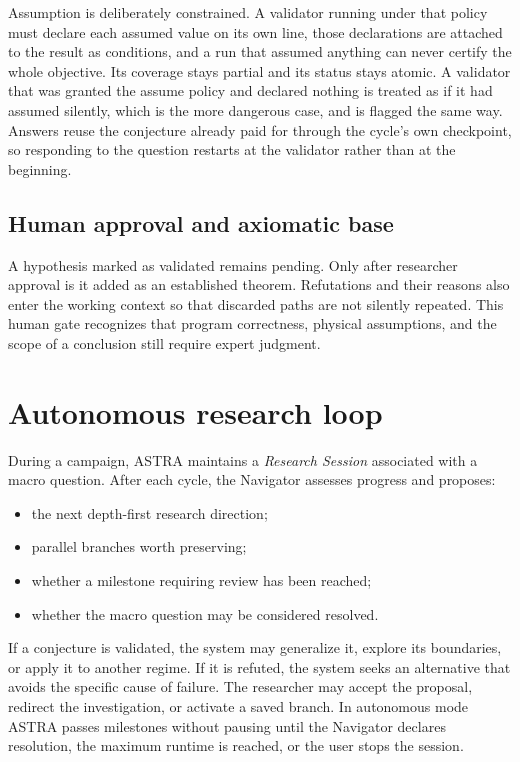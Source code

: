 \documentclass[11pt,a4paper]{article}
\begin{document}
Assumption is deliberately constrained. A validator running under that policy must declare each assumed value on its own line, those declarations are attached to the result as conditions, and a run that assumed anything can never certify the whole objective. Its coverage stays partial and its status stays atomic. A validator that was granted the assume policy and declared nothing is treated as if it had assumed silently, which is the more dangerous case, and is flagged the same way. Answers reuse the conjecture already paid for through the cycle's own checkpoint, so responding to the question restarts at the validator rather than at the beginning.

\subsection{Human approval and axiomatic base}

A hypothesis marked as validated remains pending. Only after researcher approval is it added as an established theorem. Refutations and their reasons also enter the working context so that discarded paths are not silently repeated. This human gate recognizes that program correctness, physical assumptions, and the scope of a conclusion still require expert judgment.

\section{Autonomous research loop}

During a campaign, ASTRA maintains a \textit{Research Session} associated with a macro question. After each cycle, the Navigator assesses progress and proposes:

\begin{itemize}
  \item the next depth-first research direction;
  \item parallel branches worth preserving;
  \item whether a milestone requiring review has been reached;
  \item whether the macro question may be considered resolved.
\end{itemize}

If a conjecture is validated, the system may generalize it, explore its boundaries, or apply it to another regime. If it is refuted, the system seeks an alternative that avoids the specific cause of failure. The researcher may accept the proposal, redirect the investigation, or activate a saved branch. In autonomous mode ASTRA passes milestones without pausing until the Navigator declares resolution, the maximum runtime is reached, or the user stops the session.
\end{document}
